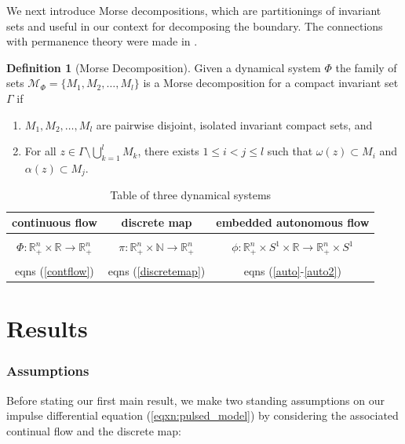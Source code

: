 \documentclass{article}
\theoremstyle{definition}
\newtheorem{definition}{Definition}[section]
\newcommand{\R}{{\mathbb{R}}}
\newcommand{\N}{{\mathbb{N}}}
\begin{document}
We next introduce Morse decompositions, which are partitionings of invariant sets and useful in our context for decomposing the boundary.  The connections with permanence theory were made in \cite{garay1989uniform}.

\begin{definition}[Morse Decomposition]
    Given a dynamical system $\Phi$ the family of sets $\mathcal{M}_\Phi = \{M_1, M_2, \ldots, M_l\}$ is a Morse decomposition for a compact invariant set $\Gamma$ if
    \begin{enumerate}
        \item $M_1, M_2, \ldots, M_l$ are pairwise disjoint, isolated invariant compact sets, and
        \item For all $z \in \Gamma \setminus \bigcup^l_{k=1} M_k$, there exists $1 \leq i < j \leq l$ such that $\omega(z) \subset M_i$ and $\alpha(z) \subset M_j$.
    \end{enumerate}
\end{definition}


\begin{table}[]
    \centering
    \begin{tabular}{c|c|c}
        continuous flow &  discrete map & embedded autonomous flow \\
        \hline 
        & & \\
        
        $\Phi: \R^n_+ \times \R \rightarrow \R^n_+ $& $\pi: \R^n_+ \times \N \rightarrow \R^n_+ $ & $\phi: \R^n_+ \times S^1 \times \R \rightarrow \R^n_+ \times S^1 $\\

         & & \\
eqns (\ref{contflow}) & eqns (\ref{discretemap}) & eqns (\ref{auto}-\ref{auto2}) \\
    \end{tabular}
    \caption{Table of three dynamical systems}
    \label{table}
\end{table}



\section{Results}\label{sect:results}
\subsubsection{Assumptions}
Before stating our first main result, we make two standing assumptions on our impulse differential equation (\ref{eqxn:pulsed_model}) by considering the associated continual flow and the discrete map:
\\
\end{document}
